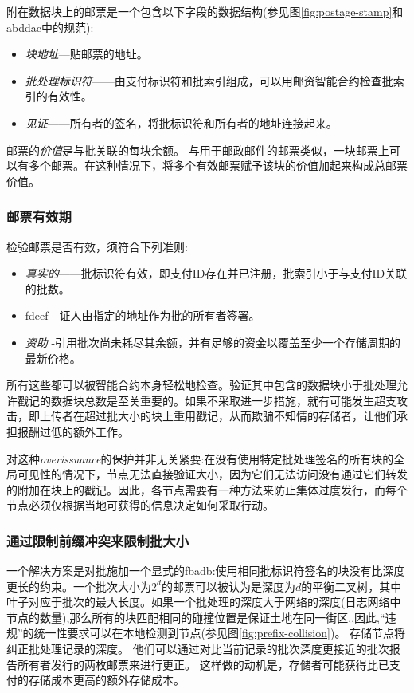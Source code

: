 附在数据块上的邮票是一个包含以下字段的数据结构(参见图\ref{fig:postage-stamp}和abddac中的规范):

\begin{itemize}
    \item \emph{块地址}—贴邮票的地址。 
    \item \emph{批处理标识符}——由支付标识符和批索引组成，可以用邮资智能合约检查批索引的有效性。
    \item \emph{见证}——所有者的签名，将批标识符和所有者的地址连接起来。
\end{itemize}

邮票的\emph{价值}是与批关联的每块余额。
与用于邮政邮件的邮票类似，一块邮票上可以有多个邮票。在这种情况下，将多个有效邮票赋予该块的价值加起来构成总邮票价值。 

\subsubsection{邮票有效期}

检验邮票是否有效，须符合下列准则:

\begin{itemize}
\item \emph{真实的}——批标识符有效，即支付ID存在并已注册，批索引小于与支付ID关联的批数。
\item fdeef—证人由指定的地址作为批的所有者签署。
\item \emph{资助} -引用批次尚未耗尽其余额，并有足够的资金以覆盖至少一个存储周期的最新价格。
\end{itemize}

所有这些都可以被智能合约本身轻松地检查。验证其中包含的数据块小于批处理允许戳记的数据块总数是至关重要的。如果不采取进一步措施，就有可能发生超支攻击，即上传者在超过批大小的块上重用戳记，从而欺骗不知情的存储者，让他们承担报酬过低的额外工作。 

对这种\emph{overissuance}的保护并非无关紧要:在没有使用特定批处理签名的所有块的全局可见性的情况下，节点无法直接验证大小，因为它们无法访问没有通过它们转发的附加在块上的戳记。因此，各节点需要有一种方法来防止集体过度发行，而每个节点必须仅根据当地可获得的信息决定如何采取行动。

\subsubsection{通过限制前缀冲突来限制批大小}

一个解决方案是对批施加一个显式的fbadb:使用相同批标识符签名的块没有比深度更长的约束。一个批次大小为$2^d$的邮票可以被认为是深度为$d$的平衡二叉树，其中叶子对应于批次的最大长度。如果一个批处理的深度大于网络的深度(日志网络中节点的数量),那么所有的块匹配相同的碰撞位置是保证土地在同一街区,,因此,“违规”的统一性要求可以在本地检测到节点(参见图\ref{fig:prefix-collision})。 
存储节点将纠正批处理记录的深度。
他们可以通过对比当前记录的批次深度更接近的批次报告所有者发行的两枚邮票来进行更正。
这样做的动机是，存储者可能获得比已支付的存储成本更高的额外存储成本。


